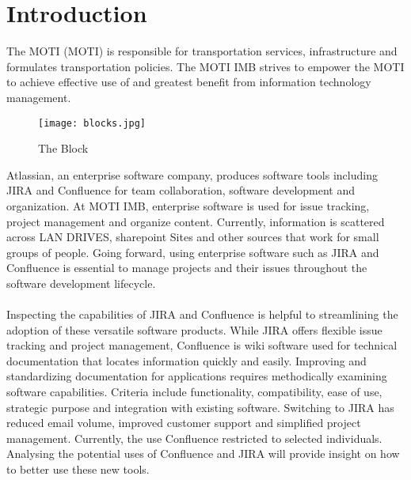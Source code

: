 \section{Introduction}
The \gls{MOTI} (MOTI) is responsible for transportation services, infrastructure and formulates transportation policies. The \gls{MOTI} \gls{IMB} strives to empower the \gls{MOTI} to achieve effective use of and greatest benefit from information technology management. \\ 

\begin{figure}
\texttt{[image: blocks.jpg]}
\caption{The Block}
\end{figure}


Atlassian, an enterprise software company, produces software tools including \gls{JIRA} and Confluence for team collaboration, software development and organization. At MOTI IMB, enterprise software is used for issue tracking, project management and organize content. Currently, information is scattered across LAN DRIVES, \gls{sharepoint} Sites and other sources that work for small groups of people. Going forward, using enterprise software such as JIRA and Confluence is essential to manage projects and their issues throughout the software development lifecycle. 
\\ \\
Inspecting the capabilities of JIRA and Confluence is helpful to streamlining the adoption of these versatile software products. While JIRA offers flexible issue tracking and project management, Confluence is wiki software used for technical documentation that locates information quickly and easily. Improving and standardizing documentation for applications requires methodically examining software capabilities. Criteria include functionality, compatibility, ease of use, strategic purpose and integration with existing software. Switching to JIRA has reduced email volume, improved customer support and simplified project management. Currently, the use Confluence restricted to selected individuals. Analysing the potential uses of Confluence and JIRA will provide insight on how to better use these new tools.